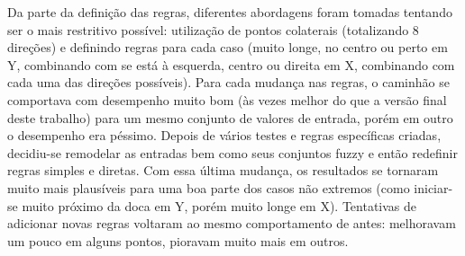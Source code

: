 \documentclass[twocolumn]{article}
\begin{document}
    Da parte da definição das regras, diferentes abordagens foram tomadas
    tentando ser o mais restritivo possível: utilização de pontos colaterais
    (totalizando 8 direções) e definindo regras para cada caso (muito longe, no
    centro ou perto em Y, combinando com se está à esquerda, centro ou direita
    em X, combinando com cada uma das direções possíveis). Para cada mudança
    nas regras, o caminhão se comportava com desempenho muito bom (às vezes
    melhor do que a versão final deste trabalho) para um mesmo conjunto de
    valores de entrada, porém em outro o desempenho era péssimo. Depois de
    vários testes e regras específicas criadas, decidiu-se remodelar as
    entradas bem como seus conjuntos fuzzy e então redefinir regras simples e
    diretas. Com essa última mudança, os resultados se tornaram muito mais
    plausíveis para uma boa parte dos casos não extremos (como iniciar-se muito
    próximo da doca em Y, porém muito longe em X). Tentativas de adicionar
    novas regras voltaram ao mesmo comportamento de antes: melhoravam um pouco
    em alguns pontos, pioravam muito mais em outros.

    
    
    \nocite{*}
\end{document}
